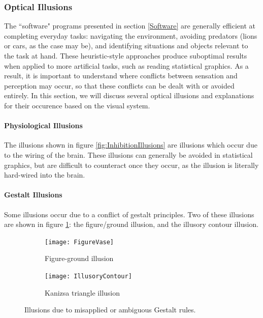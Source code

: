 \documentclass[11pt]{isuthesis}\usepackage[]{graphicx}\usepackage[]{color}
\begin{document}
\subsubsection{Optical Illusions}
The ``software" programs presented in section \ref{Software} are generally efficient at completing everyday tasks: navigating the environment, avoiding predators (lions or cars, as the case may be), and identifying situations and objects relevant to the task at hand. These heuristic-style approaches produce suboptimal results when applied to more artificial tasks, such as reading statistical graphics. As a result, it is important to understand where conflicts between sensation and perception may occur, so that these conflicts can be dealt with or avoided entirely. In this section, we will discuss several optical illusions and explanations for their occurence based on the visual system.

\paragraph{Physiological Illusions} The illusions shown in figure \ref{fig:InhibitionIllusions} are illusions which occur due to the wiring of the brain. These illusions can generally be avoided in statistical graphics, but are difficult to counteract once they occur, as the illusion is literally hard-wired into the brain. 

\paragraph{Gestalt Illusions} Some illusions occur due to a conflict of gestalt principles. Two of these illusions are shown in figure \ref{fig:GestaltIllusions}: the figure/ground illusion, and the illusory contour illusion. 

\begin{figure}[htbp]\centering
\hfil
\begin{subfigure}[b]{.4\linewidth}\centering\vspace{.5cm}
  \texttt{[image: FigureVase]}\vspace{1cm}
  \caption{Figure-ground illusion}
\end{subfigure}\hfill
\begin{subfigure}[b]{.4\linewidth}\centering
  \texttt{[image: IllusoryContour]}
  \caption{Kanizsa triangle illusion}
\end{subfigure}\hfil
\caption[Gestalt illusions]{Illusions due to misapplied or ambiguous Gestalt rules.}\label{fig:GestaltIllusions}
\end{figure}
\end{document}
